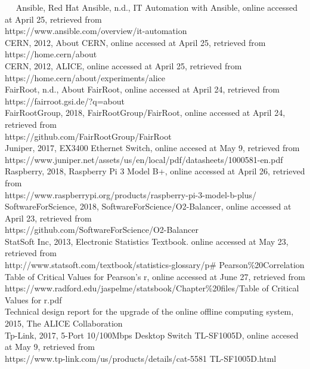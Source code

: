 ~~ Ansible, Red Hat Ansible, n.d., IT Automation with Ansible, online accessed at April 25, retrieved from \\https://www.ansible.com/overview/it-automation\\

CERN, 2012, About CERN, online accessed at April 25, retrieved from \\https://home.cern/about\\

CERN, 2012, ALICE, online accessed at April 25, retrieved from \\https://home.cern/about/experiments/alice\\

FairRoot, n.d., About FairRoot, online accessed at April 24, retrieved from \\https://fairroot.gsi.de/?q=about\\

FairRootGroup, 2018, FairRootGroup/FairRoot, online accessed at April 24, retrieved from \\https://github.com/FairRootGroup/FairRoot\\

Juniper, 2017, EX3400 Ethernet Switch, online accesed at May 9, retrieved from \\https://www.juniper.net/assets/us/en/local/pdf/datasheets/1000581-en.pdf\\

Raspberry, 2018, Raspberry Pi 3 Model B+, online accessed at April 26, retrieved from \\https://www.raspberrypi.org/products/raspberry-pi-3-model-b-plus/\\

SoftwareForScience, 2018, SoftwareForScience/O2-Balancer, online accessed at April 23, retrieved from \\https://github.com/SoftwareForScience/O2-Balancer\\

StatSoft Inc, 2013, Electronic Statistics Textbook. online accessed at May 23, retrieved from  \\http://www.statsoft.com/textbook/statistics-glossary/p\# Pearson\%20Correlation\\

Table of Critical Values for Pearson's r, online accessed at June 27, retrieved from \\https://www.radford.edu/jaspelme/statsbook/Chapter\%20files/Table of Critical Values for r.pdf\\

Technical design report for the upgrade of the online offline computing system, 2015, The ALICE Collaboration\\

Tp-Link, 2017, 5-Port 10/100Mbps Desktop Switch TL-SF1005D, online accesed at May 9, retrieved from \\https://www.tp-link.com/us/products/details/cat-5581 TL-SF1005D.html\\